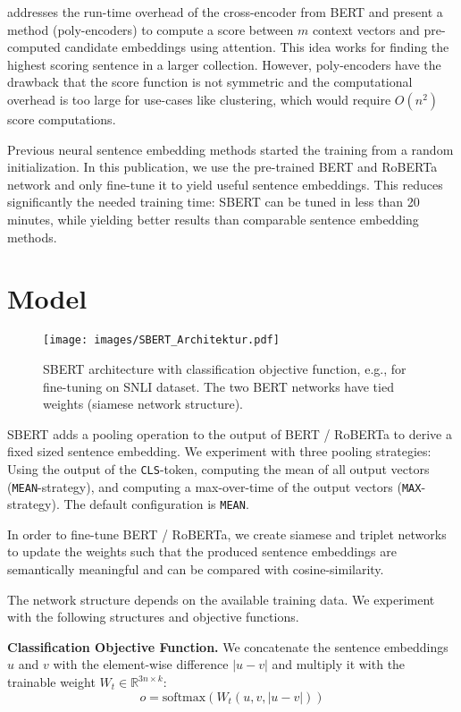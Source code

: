 \documentclass[11pt,a4paper]{article}
\begin{document}
 addresses the run-time overhead of the cross-encoder from BERT and present a method (poly-encoders) to compute a score between $m$ context vectors and pre-computed candidate embeddings using attention. This idea works for finding the highest scoring sentence in a larger collection. However, poly-encoders have the drawback that the score function is not symmetric and the computational overhead is too large for use-cases like clustering, which would require $O(n^2)$ score computations. 

Previous neural sentence embedding methods started the training from a random initialization. In this publication, we use the pre-trained BERT and RoBERTa network and only fine-tune it to yield useful sentence embeddings. This reduces significantly the needed training time: SBERT can be tuned in less than 20 minutes, while yielding better results than comparable sentence embedding methods.


\section{Model} \label{sec_model}


\begin{figure}[t]
	\centering
	\texttt{[image: images/SBERT\_Architektur.pdf]}
	\caption{SBERT architecture with classification objective function, e.g., for fine-tuning on SNLI dataset. The two BERT networks have tied weights (siamese network structure).}
	\label{fig_sbert_softmax}
\end{figure}


SBERT adds a pooling operation to the output of BERT / RoBERTa to derive a fixed sized sentence embedding.  We experiment with three pooling strategies: Using the output of the \texttt{CLS}-token, computing the mean of all output vectors (\texttt{MEAN}-strategy), and computing a max-over-time of the output vectors (\texttt{MAX}-strategy). The default configuration is \texttt{MEAN}.

In order to fine-tune BERT / RoBERTa, we create siamese and triplet networks \cite{triplet_network} to update the weights such that the produced sentence embeddings are semantically meaningful and can be compared with cosine-similarity.


The network structure depends on the available training data. We experiment with the following structures and objective functions.

\textbf{Classification Objective Function.} We concatenate the sentence embeddings $u$ and $v$ with the element-wise difference $|u-v|$ and multiply it with the trainable weight $W_t \in \mathbb{R}^{3n \times k}$:
$$o = \text{softmax}(W_t (u, v, |u-v|))$$
\end{document}
